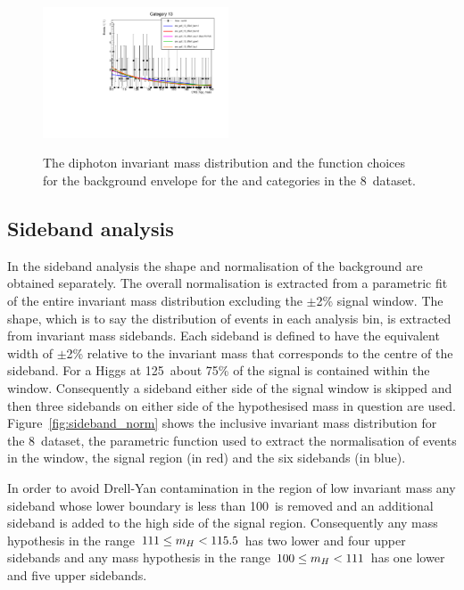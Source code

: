 \begin{figure}
  \includegraphics[width=0.49\textwidth]{analysis/plots/mva_8TeV/multipdf_cat13.pdf}\\
  \caption{The diphoton invariant mass distribution and the function choices for the background envelope for the \VH and \ttH categories in the 8~\TeV dataset. }
  \label{fig:multipdf6}
\end{figure}

\subsection{Sideband analysis}

In the sideband analysis the shape and normalisation of the background are obtained separately. The overall normalisation is extracted from a parametric fit of the entire invariant mass distribution excluding the $\pm$2\% signal window. The shape, which is to say the distribution of events in each analysis bin, is extracted from invariant mass sidebands. Each sideband is defined to have the equivalent width of $\pm$2\% relative to the invariant mass that corresponds to the centre of the sideband. For a \SM Higgs at 125~\GeV about 75\% of the signal is contained within the window. Consequently a sideband either side of the signal window is skipped and then three sidebands on either side of the hypothesised mass in question are used. Figure~\ref{fig:sideband_norm} shows the inclusive invariant mass distribution for the 8~\TeV dataset, the parametric function used to extract the normalisation of events in the window, the signal region (in red) and the six sidebands (in blue).

In order to avoid Drell-Yan contamination in the region of low invariant mass any sideband whose lower boundary is less than 100~\GeV is removed and an additional sideband is added to the high side of the signal region. Consequently any mass hypothesis in the range $111\leq m_{H}< 115.5$ has two lower and four upper sidebands and any mass hypothesis in the range $100\leq m_{H}<111$ has one lower and five upper sidebands.

